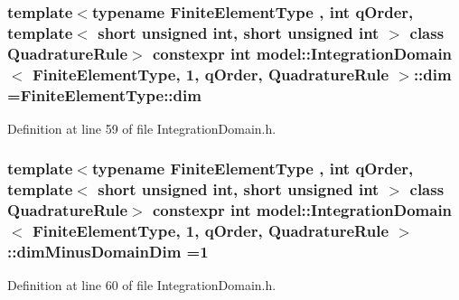 \subsubsection[{dim}]{\setlength{\rightskip}{0pt plus 5cm}template$<$typename Finite\+Element\+Type , int q\+Order, template$<$ short unsigned int, short unsigned int $>$ class Quadrature\+Rule$>$ constexpr int {\bf model\+::\+Integration\+Domain}$<$ Finite\+Element\+Type, 1, q\+Order, Quadrature\+Rule $>$\+::dim =Finite\+Element\+Type\+::dim\hspace{0.3cm}{\ttfamily [static]}}\label{structmodel_1_1_integration_domain_3_01_finite_element_type_00_011_00_01q_order_00_01_quadrature_rule_01_4_ac6b2db0e39e49028b80c918a7450b815}


Definition at line 59 of file Integration\+Domain.\+h.

\hypertarget{structmodel_1_1_integration_domain_3_01_finite_element_type_00_011_00_01q_order_00_01_quadrature_rule_01_4_a6e8e93aabff3aad5399c80ef79ed616d}{}
\subsubsection[{dim\+Minus\+Domain\+Dim}]{\setlength{\rightskip}{0pt plus 5cm}template$<$typename Finite\+Element\+Type , int q\+Order, template$<$ short unsigned int, short unsigned int $>$ class Quadrature\+Rule$>$ constexpr int {\bf model\+::\+Integration\+Domain}$<$ Finite\+Element\+Type, 1, q\+Order, Quadrature\+Rule $>$\+::dim\+Minus\+Domain\+Dim =1\hspace{0.3cm}{\ttfamily [static]}}\label{structmodel_1_1_integration_domain_3_01_finite_element_type_00_011_00_01q_order_00_01_quadrature_rule_01_4_a6e8e93aabff3aad5399c80ef79ed616d}


Definition at line 60 of file Integration\+Domain.\+h.

\hypertarget{structmodel_1_1_integration_domain_3_01_finite_element_type_00_011_00_01q_order_00_01_quadrature_rule_01_4_a4794e96f792f2344e4ac5842f50f3fa3}{}
